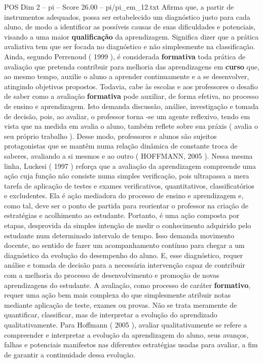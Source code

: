 \begin{textsample}{POS Dim 2 – pi – Score 26.00 – pi/pi\_em\_12.txt}
Afirma que, a partir de instrumentos adequados, possa ser estabelecido um diagnóstico justo para cada aluno, de modo a identificar as possíveis causas de suas dificuldades e potenciais, visando a uma maior \textbf{qualificação} da aprendizagem.
Significa dizer que a prática avaliativa tem que ser focada no diagnóstico e não simplesmente na classificação.
Ainda, segundo Perrenoud ( 1999 ), é considerada \textbf{formativa} toda prática de avaliação que pretenda contribuir para melhoria das aprendizagens em \textbf{curso} que, ao mesmo tempo, auxilie o aluno a aprender continuamente e a se desenvolver, atingindo objetivos propostos.
Todavia, cabe às escolas e aos professores o desafio de saber como a avaliação \textbf{formativa} pode auxiliar, de forma efetiva, no processo de ensino e aprendizagem.
Isto demanda discussão, análise, investigação e tomada de decisão, pois, ao avaliar, o professor torna -se um agente reflexivo, tendo em vista que na medida em avalia o aluno, também reflete sobre sua práxis ( avalia o seu próprio trabalho ).
Desse modo, professores e alunos são sujeitos protagonistas que se mantêm numa relação dinâmica de constante troca de saberes, avaliando a si mesmos e ao outro ( HOFFMANN, 2005 ).
Nessa mesma linha, Luckesi ( 1997 ) reforça que a avaliação da aprendizagem compreende uma ação cuja função não consiste numa simples verificação, pois ultrapassa a mera tarefa de aplicação de testes e exames verificativos, quantitativos, classificatórios e excludentes.
Ela é ação mediadora do processo de ensino e aprendizagem e, como tal, deve ser o ponto de partida para reorientar o professor na criação de estratégias e acolhimento ao estudante.
Portanto, é uma ação composta por etapas, desprovida da simples intenção de medir o conhecimento adquirido pelo estudante num determinado intervalo de tempo.
Isso demanda movimento docente, no sentido de fazer um acompanhamento contínuo para chegar a um diagnóstico da evolução do desempenho do aluno.
E, esse diagnóstico, requer análise e tomada de decisão para a necessária intervenção capaz de contribuir com a melhoria do processo de desenvolvimento e promoção de novas aprendizagens do estudante.
A avaliação, como processo de caráter \textbf{formativo}, requer uma ação bem mais complexa do que simplesmente atribuir notas mediante aplicação de teste, exames ou provas.
Não se trata meramente de quantificar, classificar, mas de interpretar a evolução do aprendizado qualitativamente.
Para Hoffmann ( 2005 ), avaliar qualitativamente se refere a compreender e interpretar a evolução da aprendizagem do aluno, seus avanços, falhas e potenciais manifestos nas diferentes estratégias usadas para avaliar, a fim de garantir a continuidade dessa evolução.

\end{textsample}
